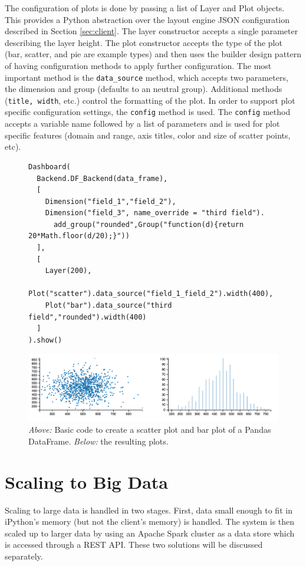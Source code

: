 \documentclass[letter,twocolumn]{article}
\begin{document}
The configuration of plots is done by passing a list of Layer and Plot objects. 
This provides a Python abstraction over the layout engine JSON configuration described in Section \ref{sec:client}.
The layer constructor accepts a single parameter describing the layer height.
The plot constructor accepts the type of the plot (bar, scatter, and pie are example types) and then uses the builder design pattern of having configuration methods to apply further configuration.
The most important method is the {\tt data\_source} method, which accepts two parameters, the dimension and group (defaults to an neutral group).
Additional methods ({\tt title, width}, etc.) control the formatting of the plot.
In order to support plot specific configuration settings, the {\tt config} method is used.
The {\tt config} method accepts a variable name followed by a list of parameters and is used for plot specific features (domain and range, axis titles, color and size of scatter points, etc).

\begin{figure}[hb]
\begin{lstlisting}
Dashboard(
  Backend.DF_Backend(data_frame), 
  [
    Dimension("field_1","field_2"),
    Dimension("field_3", name_override = "third field").
      add_group("rounded",Group("function(d){return 20*Math.floor(d/20);}"))
  ],
  [
    Layer(200),
    Plot("scatter").data_source("field_1_field_2").width(400),
    Plot("bar").data_source("third field","rounded").width(400)
  ]
).show()
\end{lstlisting}

\includegraphics[scale=.63]{figs/screenshot_scatter_bar.png}
  \caption{\emph{Above:} Basic code to create a scatter plot and bar plot of a Pandas DataFrame.  \emph{Below:} the resulting plots.}\label{fig:simple_example}
\end{figure}

\section{Scaling to Big Data}\label{sec:bigdata}%
Scaling to large data is handled in two stages.  
First, data small enough to fit in iPython's memory (but not the client's memory) is handled.  The system is then scaled up to larger data by using an Apache Spark cluster as a data store which is accessed through a REST API.  These two solutions will be discussed separately.
\end{document}
